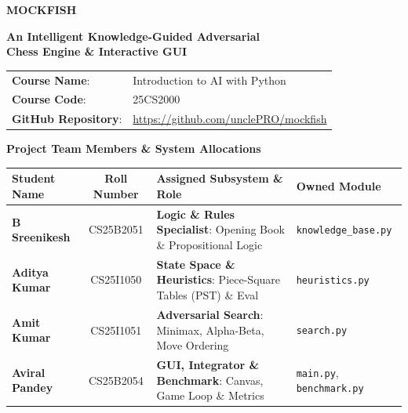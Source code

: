 \documentclass[11pt,a4paper]{article}
\begin{document}
\begin{titlepage}
    \centering
    \vspace*{1.5cm}
    
    {\Huge\bfseries\color{primaryblue} MOCKFISH \par}
    \vspace{0.4cm}
    {\LARGE\bfseries\color{darkslate} An Intelligent Knowledge-Guided Adversarial \\ Chess Engine \& Interactive GUI \par}
    \vspace{1.5cm}
    
    \colorbox{lightgraybg}{
        \begin{minipage}{0.88\textwidth}
        \vspace{0.35cm}
        \centering
        \renewcommand{\arraystretch}{1.45}
        \begin{tabular}{ll}
            \textbf{Course Name}: & Introduction to AI with Python \\
            \textbf{Course Code}: & 25CS2000 \\
            \textbf{GitHub Repository}: & \url{https://github.com/unclePRO/mockfish} \\
        \end{tabular}
        \vspace{0.35cm}
        \end{minipage}
    }
    
    \vspace{1.5cm}
    
    {\large\bfseries\color{primaryblue} Project Team Members \& System Allocations \par}
    \vspace{0.4cm}
    
    \renewcommand{\arraystretch}{1.35}
    \begin{tabularx}{0.96\textwidth}{l c Y l}
        \toprule
        \textbf{Student Name} & \textbf{Roll Number} & \textbf{Assigned Subsystem \& Role} & \textbf{Owned Module} \\
        \midrule
        \textbf{B Sreenikesh} & CS25B2051 & \textbf{Logic \& Rules Specialist}: Opening Book \& Propositional Logic & \texttt{knowledge\_base.py} \\
        \textbf{Aditya Kumar} & CS25I1050 & \textbf{State Space \& Heuristics}: Piece-Square Tables (PST) \& Eval & \texttt{heuristics.py} \\
        \textbf{Amit Kumar}   & CS25I1051 & \textbf{Adversarial Search}: Minimax, Alpha-Beta, Move Ordering & \texttt{search.py} \\
        \textbf{Aviral Pandey}& CS25B2054 & \textbf{GUI, Integrator \& Benchmark}: Canvas, Game Loop \& Metrics & \texttt{main.py}, \texttt{benchmark.py} \\
        \bottomrule
    \end{tabularx}
    

\end{titlepage}
\end{document}
